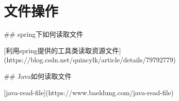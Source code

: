 \chapter{文件操作}
\label{chap:file}


## spring下如何读取文件

[利用spring提供的工具类读取资源文件](https://blog.csdn.net/quincylk/article/details/79792779)


## Java如何读取文件

[java-read-file](https://www.baeldung.com/java-read-file)